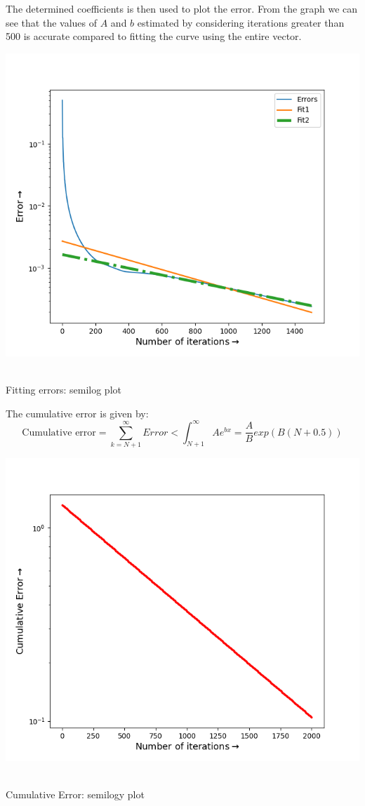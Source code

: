 \documentclass[12pt, a4paper]{report}
\begin{document}
The determined coefficients is then used to plot the error. From the graph we can see that the values of $A$ and $b$ estimated by considering iterations greater than 500 is accurate compared to fitting the curve using the entire vector.
\begin{center}
	\includegraphics[scale=0.6]{Figure7} 
	\caption{\\Fitting errors: semilog plot}
	\label{fig:rawdata}
\end{center}
The cumulative error is given by:
\begin{equation*}
    \text{Cumulative error} = \sum_{k=N+1}^{\infty}Error < \int_{N+1}^{\infty}Ae^{bx} = \frac{A}{B}exp(B(N+0.5))
\end{equation*}
\begin{center}
	\includegraphics[scale=0.6]{Figure8} 
	\caption{\\Cumulative Error: semilogy plot}
	\label{fig:rawdata}
\end{center}
\end{document}
